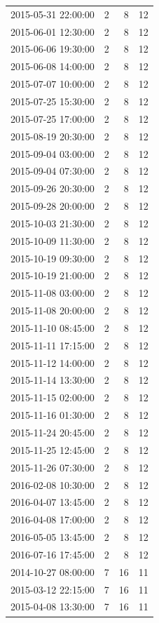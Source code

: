 \begin{tabular}{lrrr}
2015-05-31 22:00:00 & 2 & 8 & 12 \\
2015-06-01 12:30:00 & 2 & 8 & 12 \\
2015-06-06 19:30:00 & 2 & 8 & 12 \\
2015-06-08 14:00:00 & 2 & 8 & 12 \\
2015-07-07 10:00:00 & 2 & 8 & 12 \\
2015-07-25 15:30:00 & 2 & 8 & 12 \\
2015-07-25 17:00:00 & 2 & 8 & 12 \\
2015-08-19 20:30:00 & 2 & 8 & 12 \\
2015-09-04 03:00:00 & 2 & 8 & 12 \\
2015-09-04 07:30:00 & 2 & 8 & 12 \\
2015-09-26 20:30:00 & 2 & 8 & 12 \\
2015-09-28 20:00:00 & 2 & 8 & 12 \\
2015-10-03 21:30:00 & 2 & 8 & 12 \\
2015-10-09 11:30:00 & 2 & 8 & 12 \\
2015-10-19 09:30:00 & 2 & 8 & 12 \\
2015-10-19 21:00:00 & 2 & 8 & 12 \\
2015-11-08 03:00:00 & 2 & 8 & 12 \\
2015-11-08 20:00:00 & 2 & 8 & 12 \\
2015-11-10 08:45:00 & 2 & 8 & 12 \\
2015-11-11 17:15:00 & 2 & 8 & 12 \\
2015-11-12 14:00:00 & 2 & 8 & 12 \\
2015-11-14 13:30:00 & 2 & 8 & 12 \\
2015-11-15 02:00:00 & 2 & 8 & 12 \\
2015-11-16 01:30:00 & 2 & 8 & 12 \\
2015-11-24 20:45:00 & 2 & 8 & 12 \\
2015-11-25 12:45:00 & 2 & 8 & 12 \\
2015-11-26 07:30:00 & 2 & 8 & 12 \\
2016-02-08 10:30:00 & 2 & 8 & 12 \\
2016-04-07 13:45:00 & 2 & 8 & 12 \\
2016-04-08 17:00:00 & 2 & 8 & 12 \\
2016-05-05 13:45:00 & 2 & 8 & 12 \\
2016-07-16 17:45:00 & 2 & 8 & 12 \\
2014-10-27 08:00:00 & 7 & 16 & 11 \\
2015-03-12 22:15:00 & 7 & 16 & 11 \\
2015-04-08 13:30:00 & 7 & 16 & 11 \\

\end{tabular}
